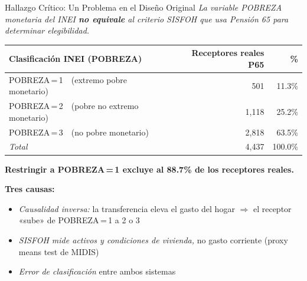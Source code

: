 \documentclass[aspectratio=169, 10pt]{beamer}
\begin{document}
\begin{frame}{Hallazgo Crítico: Un Problema en el Diseño Original}
  \textit{La variable POBREZA monetaria del INEI \textbf{no equivale} al
  criterio SISFOH que usa Pensión 65 para determinar elegibilidad.}

  \vspace{8pt}
  \begin{center}
  \small
  \begin{tabular}{l rr}
    \toprule
    \textbf{Clasificación INEI (POBREZA)} &
    \textbf{Receptores reales P65} & \textbf{\%} \\
    \midrule
    POBREZA\,=\,1\ \ (extremo pobre monetario)
      & \ \ \ 501 & 11.3\% \\
    POBREZA\,=\,2\ \ (pobre no extremo monetario)
      & 1{,}118 & 25.2\% \\
    POBREZA\,=\,3\ \ (no pobre monetario)
      & 2{,}818 & 63.5\% \\
    \midrule
    \textit{Total}
      & 4{,}437 & 100.0\% \\
    \bottomrule
  \end{tabular}
  \end{center}

  \vspace{6pt}
  \begin{alertblock}{}
    \textbf{Restringir a POBREZA\,=\,1 excluye al 88.7\% de los receptores
    reales.}
  \end{alertblock}

  \vspace{4pt}
  \textbf{Tres causas:}
  \begin{itemize}
    \setlength\itemsep{2pt}
    \item \textit{Causalidad inversa:} la transferencia eleva el gasto
          del hogar $\Rightarrow$ el receptor «sube» de POBREZA\,=\,1 a 2 o 3
    \item \textit{SISFOH mide activos y condiciones de vivienda,}
          no gasto corriente (proxy means test de MIDIS)
    \item \textit{Error de clasificación} entre ambos sistemas
  \end{itemize}
\end{frame}
\end{document}
